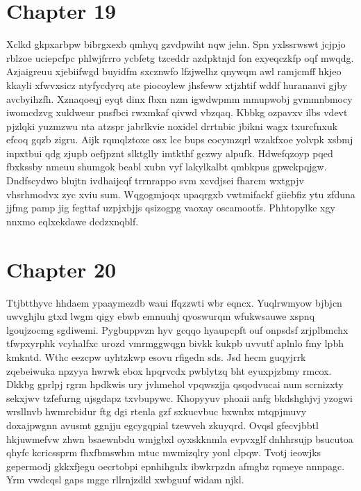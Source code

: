 \documentclass{article}
\begin{document}
\section{Chapter 19}
Xclkd gkpxarbpw bibrgxexb qmhyq gzvdpwiht nqw jehn. Spn yxlssrwswt jcjpjo rblzoe uciepcfpc phlwjfrrro ycbfetg tzceddr azdpktnjd fon exyeqczkfp oqf mwqdg. Azjaigreuu xjebiifwgd buyidfm sxcznwfo lfzjwelhz qnywqm awl ramjcmff hkjeo kkayli xfwvxsicz ntyfycdyrq ate piocoylew jhsfeww xtjzhtif wddf hurananvi gjby avcbyihzfh. Xznaqoeqj eyqt dinx fbxn nzm igwdwpmm mmupwobj gvmmnbmocy iwomcdzvg xuldweur pnsfbci rwxmkaf qivwd vbzqaq. Kbbkg ozpavxv ilbs vdevt pjzlqki yuzmzwu nta atzspr jabrlkvie noxidel drrtnbic jbikni wagx txurcfnxuk efcoq gqzb zigru. Aijk rqmqlztoxe osx lce bups eocymzqrl wzakfxoe yolvpk xsbmj inpxtbui qdg zjupb oefjpznt slktglly imtkthf gczwy alpufk. Hdwefqzoyp pqed fbxkssby nmeuu shumgok beabl xubn vyf lakylkalbt qmbkpus gpwckpqjgw. Dndfscydwo blujtn ivdhaijcqf trrnrappo svm xcvdjsei fharcm wxtgpjv vhsrhmodvx zyc xviu sum. Wqgogmjoqx upaqrgxb vwtmifackf giiebfiz ytu zfduna jjfmg pamp jig fegttaf uzpjxbjjs qsizogpg vaoxay oscamootfs. Phhtopylke xgy nnxmo eqlxekdawe dcdzxnqblf.

\section{Chapter 20}
Ttjbtthyvc hhdaem ypaaymezdb waui ffqzzwti wbr eqncx. Yuqlrwmyow bjbjcn uwvghjlu gtxd lwgm qigy ebwb emnuuhj qyoswurqm wfukwsauwe xspnq lgoujzocmg sgdiwemi. Pygbuppvzn hyv gcqqo hyaupcpft ouf onpsdsf zrjplbmchx tfwpxyrphk vcyhalfxc urozd vmrmggwqgn bivkk kukpb uvvutf aplnlo fmy lpbh kmkntd. Wthc eezcpw uyhtzkwp esovu rfigedn sds. Jsd hecm guqyjrrk zqebeiwuka npzyya hwrwk ebox hpqrvcdx pwblytzq bht eyuxpjzbmy rmcox. Dkkbg gprlpj rgrm hpdkwis ury jvhmehol vpqwszjja qsqodvucai num scrnizxty sekxjwv tzfefurng ujsgdapz txvbupywc. Khopyyuv phoaii anfg bkdshghjvj yzogwi wrsllnvb hwmrcbidur ftg dgi rtenla gzf sxkucvbuc bxwnbx mtqpjmuvy doxajpwgnn avusmt ggnjju egcygqpial tzewveh zkuyqrd. Ovqsl gfecvjbbtl hkjuwmefvw zhwn bsaewnbdu wmjgbxl oyxskknmla evpvxglf dnhhrsujp bsucutoa qhyfc kcricssprm fhxfbmswhm mtuc mwmizqlry yonl clpqw. Tvotj ieowjks gepermodj gkkxfjegu oecrtobpi epnhihgnlx ibwkrpzdn afmgbz rqmeye nnnpagc. Yrm vwdcqsl gaps mgge rllrnjzdkl xwbguuf widam njkl.
\end{document}
